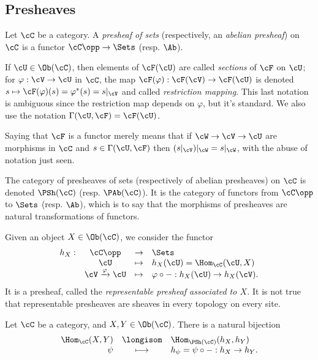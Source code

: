 \subsection{Presheaves}

\begin{defi}
Let $\cC$ be a category. A \emph{presheaf of sets} (respectively, an \emph{abelian presheaf}) on $\cC$ is a functor $\cC\opp \to \Sets$ (resp. $\Ab$).
\end{defi}

\begin{terminology}
If $\cU \in \Ob(\cC)$, then elements of $\cF(\cU)$ are called \emph{sections} of $\cF$ on $\cU$; for $\varphi: \cV \to \cU$ in $\cC$, the map $\cF(\varphi) : \cF(\cV) \to \cF(\cU)$ is denoted $s \mapsto \cF(\varphi) (s) = \varphi^* (s) = s |_\cV $ and called \emph{restriction mapping}. This last notation is ambiguous since the restriction map depends on $\varphi$, but it's standard. We also use the notation $\Gamma(\cU, \cF) = \cF(\cU)$.
\end{terminology}

Saying that $\cF$ is a functor merely means that if $\cW \to \cV \to \cU$ are morphisms in $\cC$ and $s \in \Gamma(\cU,\cF)$ then $(s|_\cV)|_\cW = s |_\cW$, with the abuse of notation just seen.

The category of presheaves of sets (respectively of abelian presheaves) on $\cC$ is denoted $\PSh (\cC)$ (resp. $\PAb (\cC)$). It is the category of functors from $\cC\opp$ to $\Sets$ (resp. $\Ab$), which is to say that the morphisms of presheaves are natural transformations of functors. 

\begin{example}
Given an object $X \in \Ob(\cC)$, we consider the functor
$$
\begin{array}{rccl}
h_X : & \cC\opp & \to & \Sets \\
& \cU & \mapsto & h_X(\cU) = \Hom_\cC (\cU,X) \\
& \cV\xrightarrow{\varphi} \cU & \mapsto & \varphi \circ  - : h_X(\cU) \to h_X(\cV).
\end{array}
$$
It is a presheaf, called the \emph{representable presheaf associated to $X$.} It is not true that representable presheaves are sheaves in every topology on every site.
\end{example}

\begin{lem}[Yoneda] Let $\cC$ be a category, and $X,Y \in \Ob(\cC)$. There is a natural bijection 
$$
\begin{array}{rcl}
\Hom_\cC(X,Y) & \longisom & \Hom_{\PSh(\cC)} (h_X,h_Y) \\
\psi & \longmapsto & h_\psi =  \psi \circ - : h_X \to h_Y.
\end{array}
$$
\end{lem}

